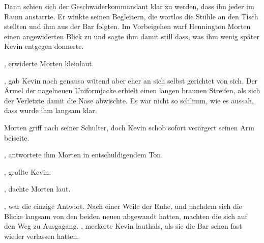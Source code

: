 \par

Dann schien sich der Geschwaderkommandant klar zu werden, dass ihn jeder im Raum anstarrte. Er winkte seinen Begleitern, die wortlos die Stühle an den Tisch stellten und ihm aus der Bar folgten. Im Vorbeigehen warf Hennington Morten einen angewiderten Blick zu und sagte ihm damit still dass, was ihm wenig später Kevin entgegen donnerte. 

\par

, erwiderte Morten kleinlaut.

\par

, gab Kevin noch genauso wütend aber eher an sich selbst gerichtet von sich. Der Ärmel der nagelneuen Uniformjacke erhielt einen langen braunen Streifen, als sich der Verletzte damit die Nase abwischte. Es war nicht so schlimm, wie es aussah, dass wurde ihm langsam klar.

\par

Morten griff nach seiner Schulter, doch Kevin schob sofort verärgert seinen Arm beiseite. 

\par

, antwortete ihm Morten in entschuldigendem Ton. 

\par

, grollte Kevin. 

\par

, dachte Morten laut.

\par

, war die einzige Antwort. Nach einer Weile der Ruhe, und nachdem sich die Blicke langsam von den beiden neuen abgewandt hatten, machten die sich auf den Weg zu Ausgagang. , meckerte Kevin lauthals, als sie die Bar schon fast wieder verlassen hatten. 

